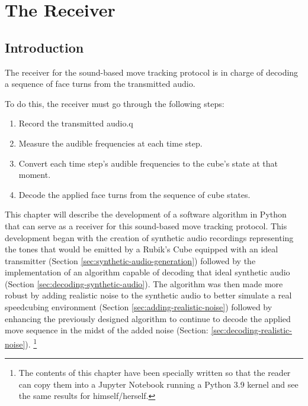 
\chapter{The Receiver} %

\label{Chapter5}

\section{Introduction}

The receiver for the sound-based move tracking protocol is in charge of
decoding a sequence of face turns from the transmitted audio.

To do this, the receiver must go through the following steps:

\begin{enumerate}
    
    \item Record the transmitted audio.q
    
    \item Measure the audible frequencies at each time step.
    
    \item Convert each time step's audible frequencies to the cube's
    state at that moment.
    
    \item Decode the applied face turns from the sequence of cube
    states.

\end{enumerate}

This chapter will describe the development of a software algorithm in
Python that can serve as a receiver for this sound-based move tracking
protocol. This development began with the creation of synthetic audio
recordings representing the tones that would be emitted by a Rubik's
Cube equipped with an ideal transmitter (Section
\ref{sec:synthetic-audio-generation}) followed by the implementation of
an algorithm capable of decoding that ideal synthetic audio (Section
\ref{sec:decoding-synthetic-audio}). The algorithm was then made more
robust by adding realistic noise to the synthetic audio to better
simulate a real speedcubing environment (Section
\ref{sec:adding-realistic-noise}) followed by enhancing the previously
designed algorithm to continue to decode the applied move sequence in
the midst of the added noise (Section:
\ref{sec:decoding-realistic-noise}). \footnote{The contents of this
chapter have been specially written so that the reader can copy them
into a Jupyter Notebook running a Python 3.9 kernel and see the same
results for himself/herself.}


